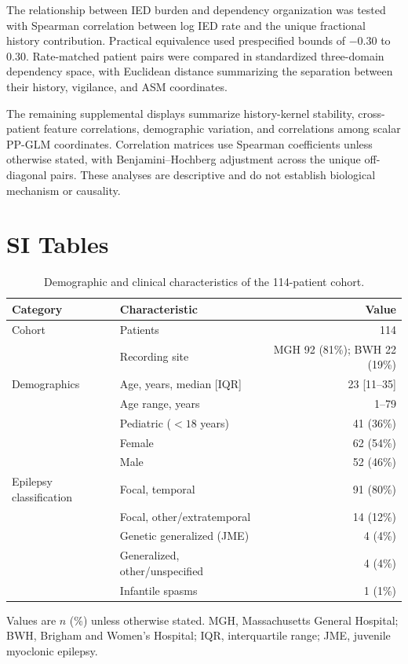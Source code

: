 \documentclass[11pt]{article}
\begin{document}
The relationship between IED burden and dependency organization was tested with Spearman correlation between log IED rate and the unique fractional history contribution. Practical equivalence used prespecified bounds of $-0.30$ to $0.30$. Rate-matched patient pairs were compared in standardized three-domain dependency space, with Euclidean distance summarizing the separation between their history, vigilance, and ASM coordinates.

The remaining supplemental displays summarize history-kernel stability, cross-patient feature correlations, demographic variation, and correlations among scalar PP-GLM coordinates. Correlation matrices use Spearman coefficients unless otherwise stated, with Benjamini--Hochberg adjustment across the unique off-diagonal pairs. These analyses are descriptive and do not establish biological mechanism or causality.

\clearpage
\section*{SI Tables}

\begin{table}[H]
\centering
\caption{Demographic and clinical characteristics of the 114-patient cohort.}
\label{tab:cohort}
\small
\begin{tabularx}{0.88\textwidth}{@{}p{}>{\raggedright\arraybackslash}X r@{}}
\toprule
Category & Characteristic & Value \\
\midrule
Cohort & Patients & 114 \\
& Recording site & MGH 92 (81\%); BWH 22 (19\%) \\
\addlinespace
Demographics & Age, years, median [IQR] & 23 [11--35] \\
& Age range, years & 1--79 \\
& Pediatric ($<18$ years) & 41 (36\%) \\
& Female & 62 (54\%) \\
& Male & 52 (46\%) \\
\addlinespace
Epilepsy classification & Focal, temporal & 91 (80\%) \\
& Focal, other/extratemporal & 14 (12\%) \\
& Genetic generalized (JME) & 4 (4\%) \\
& Generalized, other/unspecified & 4 (4\%) \\
& Infantile spasms & 1 (1\%) \\
\bottomrule
\end{tabularx}
\vspace{0.4em}
\begin{minipage}{0.88\textwidth}\footnotesize
Values are $n$ (\%) unless otherwise stated. MGH, Massachusetts General Hospital; BWH, Brigham and Women's Hospital; IQR, interquartile range; JME, juvenile myoclonic epilepsy.
\end{minipage}
\end{table}
\end{document}
